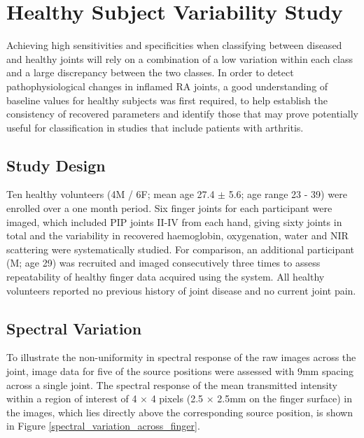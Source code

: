 \documentclass[twoside]{bhamthesis}
\theoremstyle{definition}
\begin{document}
\section{Healthy Subject Variability Study}
\label{Healthy_design}
Achieving high sensitivities and specificities when classifying between diseased and healthy joints will rely on a combination of a low variation within each class and a large discrepancy between the two classes. In order to detect pathophysiological changes in inflamed RA joints, a good understanding of baseline values for healthy subjects was first required, to help establish the consistency of recovered parameters and identify those that may prove potentially useful for classification in studies that include patients with arthritis.

\subsection{Study Design}

Ten healthy volunteers (4M / 6F; mean age 27.4 $\pm$ 5.6; age range 23 - 39) were enrolled over a one month period. Six finger joints for each participant were imaged, which included  PIP joints II-IV from each hand, giving sixty joints in total and the variability in recovered haemoglobin, oxygenation, water and NIR scattering were systematically studied. For comparison, an additional participant (M; age 29) was recruited and imaged consecutively three times to assess repeatability of healthy finger data acquired using the system. All healthy volunteers reported no previous history of joint disease and no current joint pain.


\subsection{Spectral Variation}

To illustrate the non-uniformity in spectral response of the raw images across the joint, image data for five of the source positions were assessed with 9mm spacing across a single joint. The spectral response of the mean transmitted intensity within a region of interest of 4 $\times$ 4 pixels (2.5 $\times$ 2.5mm on the finger surface) in the images, which lies directly above the corresponding source position, is shown in Figure \ref{spectral_variation_across_finger}. 
\end{document}
